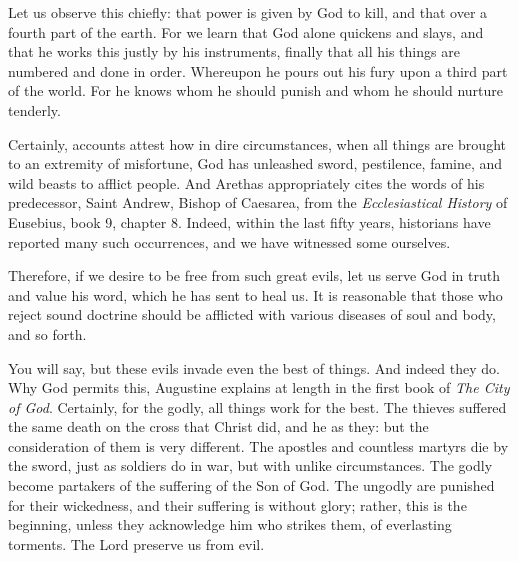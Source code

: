 Let us observe this chiefly: that power is given by God to kill, and that over a fourth part of the earth. For we learn that God alone quickens and slays, and that he works this justly by his instruments, finally that all his things are numbered and done in order. Whereupon he pours out his fury upon a third part of the world. For he knows whom he should punish and whom he should nurture tenderly.

Certainly, accounts attest how in dire circumstances, when all things are brought to an extremity of misfortune, God has unleashed sword, pestilence, famine, and wild beasts to afflict people. And Arethas appropriately cites the words of his predecessor, Saint Andrew, Bishop of Caesarea, from the \textit{Ecclesiastical History} of Eusebius, book 9, chapter 8. Indeed, within the last fifty years, historians have reported many such occurrences, and we have witnessed some ourselves.

Therefore, if we desire to be free from such great evils, let us serve God in truth and value his word, which he has sent to heal us. It is reasonable that those who reject sound doctrine should be afflicted with various diseases of soul and body, and so forth.

You will say, but these evils invade even the best of things. And indeed they do. Why God permits this, Augustine explains at length in the first book of \textit{The City of God}. Certainly, for the godly, all things work for the best. The thieves suffered the same death on the cross that Christ did, and he as they: but the consideration of them is very different. The apostles and countless martyrs die by the sword, just as soldiers do in war, but with unlike circumstances. The godly become partakers of the suffering of the Son of God. The ungodly are punished for their wickedness, and their suffering is without glory; rather, this is the beginning, unless they acknowledge him who strikes them, of everlasting torments. The Lord preserve us from evil.
